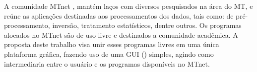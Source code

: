     A comunidade MTnet \cite{mtnet}, mantém laços com diversos pesquisados na área do MT, e reúne as aplicações destinadas aos processamentos dos dados, tais como:  de pré-processamento, inversão, tratamento estatísticos, dentre outros. Os programas alocados no MTnet são de uso livre e destinados a comunidade acadêmica. A proposta deste trabalho visa unir esses programas livres em uma única plataforma gráfica, fazendo uso de uma GUI () simples, agindo como intermediaria entre o usuário e os programas disponíveis no MTnet.
    

    
    
     
    
